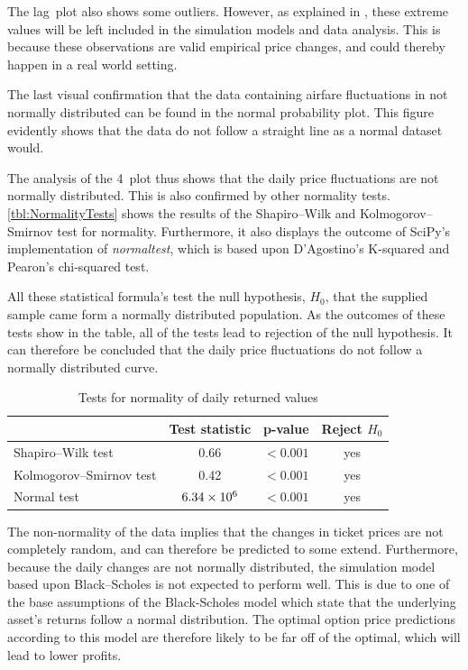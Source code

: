 The lag~plot also shows some outliers. However, as explained in , these extreme values will be left included in the simulation models and data analysis. This is because these observations are valid empirical price changes, and could thereby happen in a real world setting.

The last visual confirmation that the data containing airfare fluctuations in not normally distributed can be found in the normal probability plot. This figure evidently shows that the data do not follow a straight line as a normal dataset would. 

The analysis of the 4~plot thus shows that the daily price fluctuations are not normally distributed. This is also confirmed by other normality tests. \autoref{tbl:NormalityTests} shows the results of the Shapiro--Wilk and Kolmogorov--Smirnov test for normality. Furthermore, it also displays the outcome of SciPy's implementation of \emph{normaltest}, which is based upon D'Agostino's K-squared and Pearon's chi-squared test.

All these statistical formula's test the null hypothesis, $H_0$, that the supplied sample came form a normally distributed population. As the outcomes of these tests show in the table, all of the tests lead to rejection of the null hypothesis. It can therefore be concluded that the daily price fluctuations do not follow a normally distributed curve.


\begin{table}
\centering
\begin{tabular}{l c c c}
\toprule
~  &  Test statistic  &  p-value  &  Reject $H_0$  \\
\midrule
Shapiro--Wilk test  &  0.66  &  $< 0.001$  & yes \\
Kolmogorov--Smirnov test  & 0.42  &  $< 0.001$  & yes \\
Normal test  & $6.34 \times 10^{6}$  & $< 0.001$  & yes \\
\bottomrule
\end{tabular}
\caption{Tests for normality of daily returned values}
\label{tbl:NormalitTests}
\end{table}


The non-normality of the data implies that the changes in ticket prices are not completely random, and can therefore be predicted to some extend. Furthermore, because the daily changes are not normally distributed, the simulation model based upon Black--Scholes is not expected to perform well. This is due to one of the base assumptions of the Black-Scholes model which state that the underlying asset's returns follow a normal distribution. The optimal option price predictions according to this model are therefore likely to be far off of the optimal, which will lead to lower profits.

